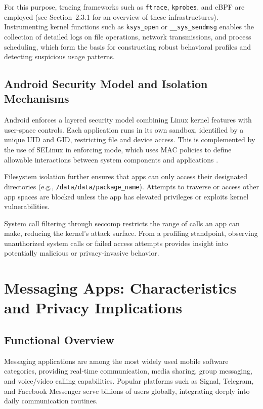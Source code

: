 \documentclass[a4paper,12pt]{report}
\begin{document}
For this purpose, tracing frameworks such as \texttt{ftrace}, \texttt{kprobes}, and eBPF are employed (see Section~2.3.1 for an overview of these infrastructures). Instrumenting kernel functions such as \texttt{ksys\_open} or \texttt{\_\_sys\_sendmsg} enables the collection of detailed logs on file operations, network transmissions, and process scheduling, which form the basis for constructing robust behavioral profiles and detecting suspicious usage patterns.

\subsection{Android Security Model and Isolation Mechanisms}
Android enforces a layered security model combining Linux kernel features with user-space controls. Each application runs in its own sandbox, identified by a unique UID and GID, restricting file and device access. This is complemented by the use of SELinux in enforcing mode, which uses MAC policies to define allowable interactions between system components and applications \cite{AOSPSecurity}.

Filesystem isolation further ensures that apps can only access their designated directories (e.g., \texttt{/data/data/{package\_name}}). Attempts to traverse or access other app spaces are blocked unless the app has elevated privileges or exploits kernel vulnerabilities.

System call filtering through seccomp restricts the range of calls an app can make, reducing the kernel's attack surface. From a profiling standpoint, observing unauthorized system calls or failed access attempts provides insight into potentially malicious or privacy-invasive behavior.

\section{Messaging Apps: Characteristics and Privacy Implications}

\subsection{Functional Overview}
Messaging applications are among the most widely used mobile software categories, providing real-time communication, media sharing, group messaging, and voice/video calling capabilities. Popular platforms such as Signal, Telegram, and Facebook Messenger serve billions of users globally, integrating deeply into daily communication routines.
\end{document}
